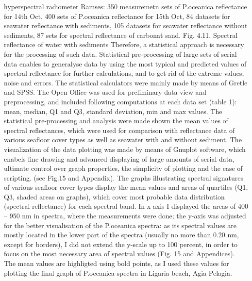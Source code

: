\documentclass[10pt, a4paper]{article}
\begin{document}
hyperspectral radiometer Ramses: 350 measuremetn sets of P.oceanica reflectance for 14th Oct, 400
sets of P.oceanica reflectance for 15th Oct, 84 datasets for seawater reflectance with sediments, 105
datasets for seawater reflectance without sediments, 87 sets for spectral reflectance of carbonat sand.
Fig. 4.11. Spectral reflectance of water with sediments
Therefore, a statistical approach is necessary for the processing of such data. Statistical pre-processing
of large sets of serial data enables to generalyse data by using the most typical and predicted values of
spectral reflectance for further calculations, and to get rid of the extreme values, noise and errors.
The statistical calculators were mainly made by means of Gretle and SPSS. The Open Office was used for preliminary data view and preprocessing, and included following computations
at each data set (table 1): mean, median, Q1 and Q3, standard deviation, min and max values. The
statistical pre-processing and analysis were made shown the mean values of spectral reflectances,
which were used for comparison with reflectance data of various seafloor cover types as well as
seawater with and without sediment.
The visualization of the data plotting was made by means of Gnuplot software, which enabels fine
drawing and advanced displaying of large amounts of serial data, ultimate control over graph properties, 
the simplicity of plotting and the ease of scripting. (see Fig.15 and Appendix).
The graphs illustrating spectral signatures of various seafloor cover types display the mean values and
areas of quartiles (Q1, Q3, shaded areas on graphs), which cover most probable data distribution
(spectral reflectance) for each spectral band. In x-axis I displayed the areas of 400 – 950 nm in
spectra, where the measurements were done; the y-axis was adjusted for the better visualisation of the
P.oceanica spectra: as its spectral values are mostly located in the lower part of the spectra (usually no
more than 0.20 nm, except for borders), I did not extend the y-scale up to 100 percent, in order to
focus on the most necessary area of spectral values (Fig. 15 and Appendices). The mean values are
highligted using bold points, as I used these values for plotting the final graph of P.oceanica spectra in
Ligaria beach, Agia Pelagia.
\end{document}

